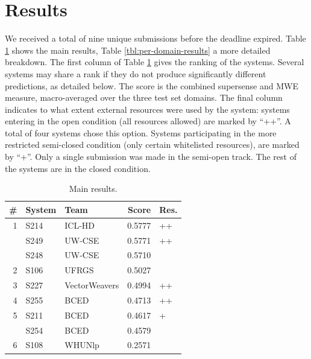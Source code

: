 \documentclass[11pt,letterpaper]{article}
\begin{document}
\section{Results}\label{sec:results}

We received a total of nine unique submissions before the deadline expired. 
Table \ref{tbl:main-results} shows the main results, Table \ref{tbl:per-domain-results} a more detailed breakdown. The first column of Table \ref{tbl:main-results} gives the ranking of the systems. Several systems may share a rank if they do not produce significantly different predictions, as detailed below. The score is the combined supersense and MWE measure, macro-averaged over the three test set domains. The final column indicates to what extent external resources were used by the system: systems entering in the open condition (all resources allowed) are marked by ``++''. A total of four systems chose this option. Systems participating in the more restricted semi-closed condition (only certain whitelisted resources), are marked by ``+''. Only a single submission was made in the semi-open track. The rest of the systems are in the closed condition. 

\begin{table}\small\centering
\begin{tabular}{rllrl}
\toprule
 \#   & System &           Team &  Score  & Res. \\
\midrule
    1 &   S214 &         ICL-HD &  0.5777 &   ++ \\
      &   S249 &         UW-CSE &  0.5771 &   ++ \\
      &   S248 &         UW-CSE &  0.5710 &      \\
    2 &   S106 &          UFRGS &  0.5027 &      \\
    3 &   S227 &  VectorWeavers &  0.4994 &   ++ \\
    4 &   S255 &           BCED &  0.4713 &   ++ \\
    5 &   S211 &           BCED &  0.4617 &    + \\
      &   S254 &           BCED &  0.4579 &      \\
    6 &   S108 &         WHUNlp &  0.2571 &      \\
\bottomrule
\end{tabular}

\caption{Main results.}

\label{tbl:main-results}
	
\end{table}
\end{document}
